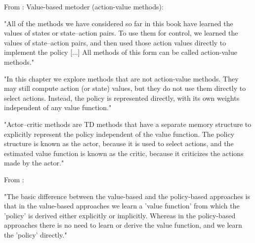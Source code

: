 From \parencite{sutton2018reinforcement_learning} :
Value-based metoder (action-value methods):

"All of the methods we have considered so far in this book have learned the values of states or state–action pairs. To use them for control, we learned the values of state–action pairs, and then used those action values directly to implement the policy [...] All methods of this form can be called action-value methods."

"In this chapter we explore methods that are not action-value methods. They may still compute action (or state) values, but they do not use them directly to select actions. Instead, the policy is represented directly, with its own weights independent of any value function."

"Actor–critic methods are TD methods that have a separate memory structure to explicitly represent the policy independent of the value function. The policy structure is known as the actor, because it is used to select actions, and the estimated value function is known as the critic, because it criticizes the actions made by the actor."

From \parencite{sewak2019policy_based_reinforcement_learning_approaches} :

"The basic difference between the value-based and the policy-based approaches is that in the value-based approaches we learn a 'value function' from which the 'policy' is derived either explicitly or implicitly. Whereas in the policy-based approaches there is no need to learn or derive the value function, and we learn the 'policy' directly."

